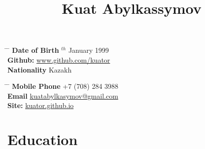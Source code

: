\documentclass[10pt]{article} %
\begin{document}

\title{Kuat Abylkassymov} %


\parbox{0.5\textwidth}{ %
\begin{tabbing} %
\hspace{3cm} \= \hspace{4cm} \= \kill %
{\bf Date of Birth} $^{th}$ January 1999 \\ %
{\bf Github:} \> \href{https://www.github.com/kuator}{www.github.com/kuator} \\ %
{\bf Nationality} \> Kazakh %
\end{tabbing}}
\hfill %
\parbox{0.5\textwidth}{ %
\begin{tabbing} %
\hspace{3cm} \= \hspace{4cm} \= \kill %
{\bf Mobile Phone} \> +7 (708) 284 3988 \\ %
{\bf Email} \> \href{mailto:kuatabylkasymov@gmail.com}{kuatabylkasymov@gmail.com} \\ %
{\bf Site:} \> \href{https://kuator.github.io}{kuator.github.io} \\ %
\end{tabbing}}


\section{Education}

\end{document}
